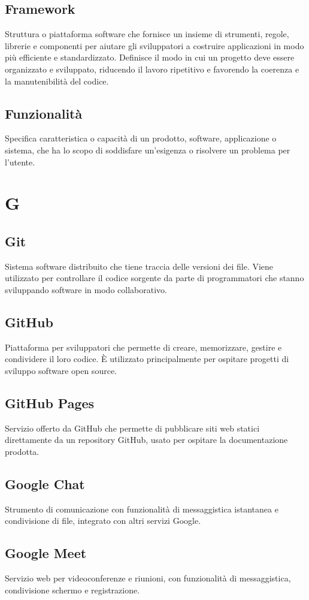     \subsection{Framework}
    Struttura o piattaforma software che fornisce un insieme di strumenti, regole, 
    librerie e componenti per aiutare gli sviluppatori a costruire applicazioni 
    in modo più efficiente e standardizzato. Definisce il modo in cui un progetto 
    deve essere organizzato e sviluppato, riducendo il lavoro ripetitivo e favorendo 
    la coerenza e la manutenibilità del codice.
    \subsection{Funzionalità}
    Specifica caratteristica o capacità di un prodotto, software, applicazione o sistema, 
    che ha lo scopo di soddisfare un'esigenza o risolvere un problema per l'utente.
\section{G}
    \subsection{Git}
    Sistema software distribuito che tiene traccia delle versioni dei file. 
    Viene utilizzato per controllare il codice sorgente da parte di programmatori 
    che stanno sviluppando software in modo collaborativo.
    \subsection{GitHub}
    Piattaforma per sviluppatori che permette di creare, memorizzare, gestire 
    e condividere il loro codice. È utilizzato principalmente per ospitare 
    progetti di sviluppo software open source.
    \subsection{GitHub Pages}
    Servizio offerto da GitHub che permette di pubblicare siti web statici direttamente da un repository GitHub,
    usato per ospitare la documentazione prodotta.
    \subsection{Google Chat}
    Strumento di comunicazione con funzionalità di messaggistica
    istantanea e condivisione di file, integrato con altri servizi Google.
    \subsection{Google Meet}    
    Servizio web per videoconferenze e riunioni, con funzionalità di messaggistica,
    condivisione schermo e registrazione.
